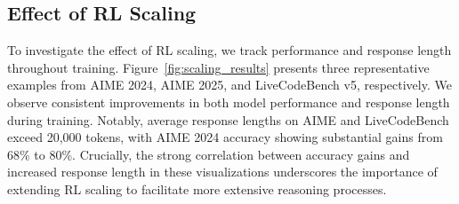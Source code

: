\subsection{Effect of RL Scaling}

To investigate the effect of RL scaling, we track performance and response length throughout training. Figure~\ref{fig:scaling_results} presents three representative examples from AIME 2024, AIME 2025, and LiveCodeBench v5, respectively. 
We observe consistent improvements in both model performance and response length during training. Notably, average response lengths on AIME and LiveCodeBench exceed 20,000 tokens, with AIME 2024 accuracy showing substantial gains from 68\% to 80\%. Crucially, the strong correlation between accuracy gains and increased response length in these visualizations underscores the importance of extending RL scaling to facilitate more extensive reasoning processes.
